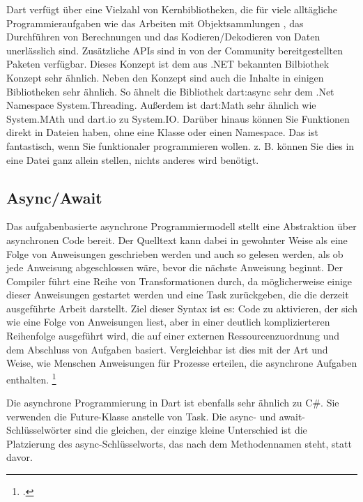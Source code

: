 Dart verfügt über eine Vielzahl von Kernbibliotheken, die für viele alltägliche Programmieraufgaben wie das Arbeiten mit Objektsammlungen , das Durchführen von Berechnungen und das Kodieren/Dekodieren von Daten  unerlässlich sind.  Zusätzliche APIs sind in von der Community bereitgestellten Paketen verfügbar. Dieses Konzept ist dem aus .NET bekannten Bilbiothek Konzept sehr ähnlich.
Neben den Konzept sind auch die Inhalte in einigen Bibliotheken sehr ähnlich. So ähnelt die Bibliothek dart:async sehr dem .Net Namespace System.Threading.  Außerdem ist dart:Math sehr ähnlich wie System.MAth und dart.io zu System.IO.
Darüber hinaus können Sie Funktionen direkt in Dateien haben, ohne eine Klasse oder einen Namespace. Das ist fantastisch, wenn Sie funktionaler programmieren wollen. z. B. können Sie dies in eine Datei ganz allein stellen, nichts anderes wird benötigt.

\subsection{Async/Await}
Das aufgabenbasierte asynchrone Programmiermodell stellt eine Abstraktion über asynchronen Code bereit. Der Quelltext kann dabei in gewohnter Weise als eine Folge von Anweisungen geschrieben werden und auch so gelesen werden, als ob jede Anweisung abgeschlossen wäre, bevor die nächste Anweisung beginnt. Der Compiler führt eine Reihe von Transformationen durch, da möglicherweise einige dieser Anweisungen gestartet werden und eine Task zurückgeben, die die derzeit ausgeführte Arbeit darstellt.
Ziel dieser Syntax ist es: Code zu aktivieren, der sich wie eine Folge von Anweisungen liest, aber in einer deutlich komplizierteren Reihenfolge ausgeführt wird, die auf einer externen Ressourcenzuordnung und dem Abschluss von Aufgaben basiert. Vergleichbar ist dies mit der Art und Weise, wie Menschen Anweisungen für Prozesse erteilen, die asynchrone Aufgaben enthalten.  \footcite[Vgl. MICROSFT Async await][Abgerufen am \today]{GoogleFlutterSharedPreferences2020} 

Die asynchrone Programmierung in Dart ist ebenfalls sehr ähnlich zu C\#. Sie verwenden die Future-Klasse anstelle von Task. Die async- und await-Schlüsselwörter sind die gleichen, der einzige kleine Unterschied ist die Platzierung des async-Schlüsselworts, das nach dem Methodennamen steht, statt davor.

\begin{minipage}{\linewidth}

\end{minipage}


